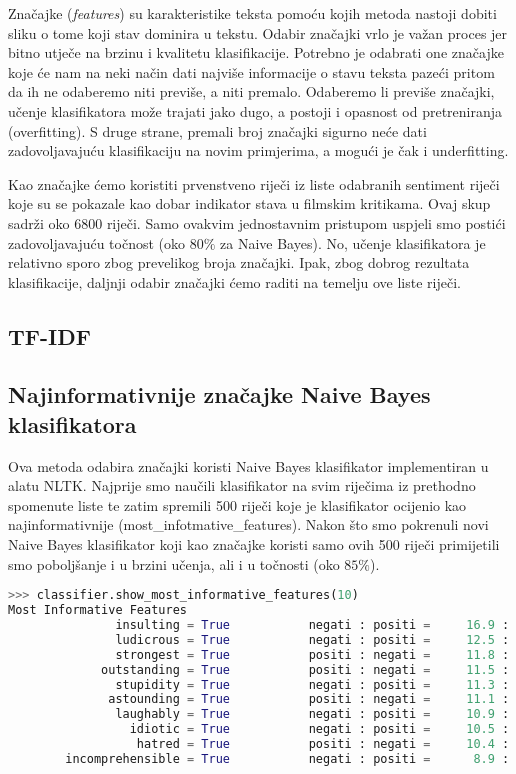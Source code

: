 \documentclass[conference]{IEEEtran}
\begin{document}
Značajke (\textit{features}) su karakteristike teksta pomoću kojih metoda nastoji dobiti sliku o tome koji stav dominira u tekstu. Odabir značajki vrlo je važan proces jer bitno utječe na brzinu i kvalitetu klasifikacije. Potrebno je odabrati one značajke koje će nam na neki način dati najviše informacije o stavu teksta pazeći pritom da ih ne odaberemo niti previše, a niti premalo. Odaberemo li previše značajki, učenje klasifikatora može trajati jako dugo, a postoji i opasnost od pretreniranja (overfitting). S druge strane, premali broj značajki sigurno neće dati zadovoljavajuću klasifikaciju na novim primjerima, a mogući je čak i underfitting.

Kao značajke ćemo koristiti prvenstveno riječi iz liste odabranih sentiment riječi \cite{words} koje su se pokazale kao dobar indikator stava u filmskim kritikama. Ovaj skup sadrži oko 6800 riječi. Samo ovakvim jednostavnim pristupom uspjeli smo postići zadovoljavajuću točnost (oko $80\%$ za Naive Bayes). No, učenje klasifikatora je relativno sporo zbog prevelikog broja značajki. Ipak, zbog dobrog rezultata klasifikacije, daljnji odabir značajki ćemo raditi na temelju ove liste riječi.

\subsection{TF-IDF}

\subsection{Najinformativnije značajke Naive Bayes klasifikatora}

Ova metoda odabira značajki koristi Naive Bayes klasifikator implementiran u alatu NLTK. Najprije smo naučili klasifikator na svim riječima iz prethodno spomenute liste te zatim spremili 500 riječi koje je klasifikator ocijenio kao najinformativnije (most\_infotmative\_features). Nakon što smo pokrenuli novi Naive Bayes klasifikator koji kao značajke koristi samo ovih 500 riječi primijetili smo poboljšanje i u brzini učenja, ali i u točnosti (oko $85\%$).

\begin{lstlisting}[language = Python, frame = single, basicstyle=\tiny\ttfamily]
>>> classifier.show_most_informative_features(10)
Most Informative Features
               insulting = True           negati : positi =     16.9 : 1.0
               ludicrous = True           negati : positi =     12.5 : 1.0
               strongest = True           positi : negati =     11.8 : 1.0
             outstanding = True           positi : negati =     11.5 : 1.0
               stupidity = True           negati : positi =     11.3 : 1.0
              astounding = True           positi : negati =     11.1 : 1.0
               laughably = True           negati : positi =     10.9 : 1.0
                 idiotic = True           negati : positi =     10.5 : 1.0
                  hatred = True           positi : negati =     10.4 : 1.0
        incomprehensible = True           negati : positi =      8.9 : 1.0
\end{lstlisting}
\end{document}
